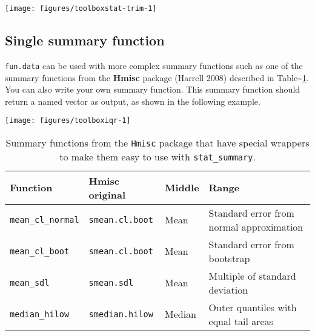 \begin{flushleft}\texttt{[image: figures/toolboxstat-trim-1]} \end{flushleft}

\subsection{Single summary function}

\texttt{fun.data} can be used with more complex summary functions such
as one of the summary functions from the \textbf{Hmisc} package (Harrell
2008) described in Table\textasciitilde{}\ref{tbl:hmisc}. You can also
write your own summary function. This summary function should return a
named vector as output, as shown in the following example.

\begin{Shaded}
\begin{Highlighting}[]
\NormalTok{>}\StringTok{ }\StringTok{ }
\NormalTok{+}\StringTok{   }\StringTok{ }\NormalTok{(}\NormalTok{(}\NormalTok{, }\NormalTok{), } 
\NormalTok{+}\StringTok{   }\StringTok{ }\NormalTok{(}\NormalTok{, }\NormalTok{)}
\NormalTok{+}\StringTok{   }
\NormalTok{+}\StringTok{ }\NormalTok{\}}
\NormalTok{>}\StringTok{ }\StringTok{ }\NormalTok{(} \NormalTok{, }\NormalTok{)}
\end{Highlighting}
\end{Shaded}

\begin{flushleft}\texttt{[image: figures/toolboxiqr-1]} \end{flushleft}

\begin{table}
  \begin{center}
  \begin{tabular}{lllp{2in}}
    \toprule
    Function & Hmisc original & Middle & Range \\
    \midrule 
    \texttt{mean_cl_normal} & \texttt{smean.cl.boot} & 
      Mean & Standard error from normal approximation \\
    \texttt{mean_cl_boot} & \texttt{smean.cl.boot} & 
      Mean & Standard error from bootstrap \\
    \texttt{mean_sdl} & \texttt{smean.sdl} & 
      Mean & Multiple of standard deviation  \\
    \texttt{median_hilow} & \texttt{smedian.hilow}  & 
      Median & Outer quantiles with equal tail areas \\
    \bottomrule
  \end{tabular}
  \end{center}
  \caption{Summary functions from the \texttt{Hmisc} package that have special wrappers to make them easy to use with \texttt{stat_summary}.}
  \label{tbl:hmisc}
\end{table}

